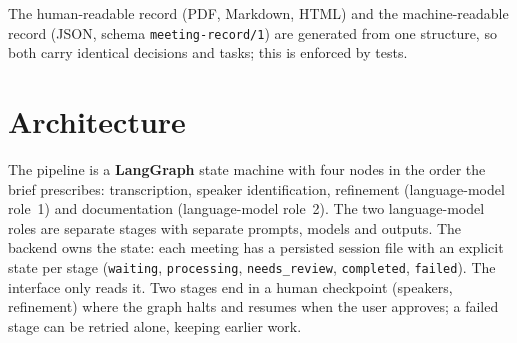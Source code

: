 \documentclass[10pt,a4paper]{article}
\newcommand{\tag}[1]{\textcolor{brand}{\textbf{#1}}}
\newcommand{\code}[1]{\texttt{\small #1}}
\begin{document}
The human-readable record (PDF, Markdown, HTML) and the machine-readable record (JSON, schema \code{meeting-record/1}) are generated from one structure, so both carry identical decisions and tasks; this is enforced by tests.

\section{Architecture}
The pipeline is a \tag{LangGraph} state machine with four nodes in the order the brief prescribes: transcription, speaker identification, refinement (language-model role~1) and documentation (language-model role~2). The two language-model roles are separate stages with separate prompts, models and outputs.
The backend owns the state: each meeting has a persisted session file with an explicit state per stage (\code{waiting}, \code{processing}, \code{needs\_review}, \code{completed}, \code{failed}). The interface only reads it. Two stages end in a human checkpoint (speakers, refinement) where the graph halts and resumes when the user approves; a failed stage can be retried alone, keeping earlier work.
\end{document}
